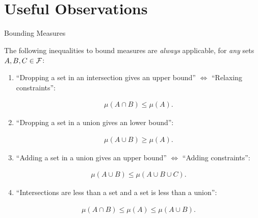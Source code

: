 
\section{Useful Observations}

\begin{observation}{}{Bounding Measures}

    The following inequalities to bound measures are \emph{always} applicable, for \emph{any} sets $A, B, C \in \mathcal{F}$:

    \begin{enumerate}
        \item ``Dropping a set in an intersection gives an upper bound'' $\Leftrightarrow$ ``Relaxing constraints'':

            \begin{align*}
                \mu(A \cap B) \leq \mu(A).
            \end{align*}
        \item ``Dropping a set in a union gives an lower bound'':

            \begin{align*}
                \mu(A \cup B) \geq \mu(A).
            \end{align*}
        \item ``Adding a set in a union gives an upper bound'' $\Leftrightarrow$ ``Adding constraints'':

            \begin{align*}
                \mu(A \cup B) \leq \mu(A \cup B \cup C).
            \end{align*}
        \item ``Intersections are less than a set and a set is less than a union'':

            \begin{align*}
                \mu(A \cap B) \leq \mu(A) \leq \mu(A \cup B).
            \end{align*}
    \end{enumerate}

\end{observation}


